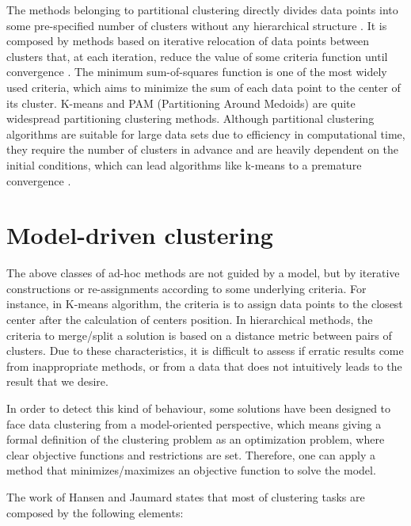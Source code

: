 The methods belonging to partitional clustering directly divides data points into some pre-specified number of clusters without any hierarchical structure \cite{Xu2005}. It is composed by methods based on iterative relocation of data points between clusters that, at each iteration, reduce the value of some criteria function until convergence \cite{Karkkainen2006}. The minimum sum-of-squares function is one of the most widely used criteria, which aims to minimize the sum of each data point to the center of its cluster. K-means and PAM (Partitioning Around Medoids) are quite widespread partitioning clustering methods. Although partitional clustering algorithms are suitable for large data sets due to efficiency in computational time, they require the number of clusters in advance and are heavily dependent on the initial conditions, which can lead algorithms like k-means to a premature convergence \cite{Das2009}.

\section{Model-driven clustering}
The above classes of ad-hoc methods are not guided by a model, but by iterative constructions or re-assignments according to some underlying criteria. For instance, in K-means algorithm, the criteria is to assign data points to the closest center after the calculation of centers position. In hierarchical methods, the criteria to merge/split a solution is based on a distance metric between pairs of clusters. Due to these characteristics, it is difficult to assess if erratic results come from inappropriate methods, or from a data that does not intuitively leads to the result that we desire.

In order to detect this kind of behaviour, some solutions have been designed to face data clustering from a model-oriented perspective, which means giving a formal definition of the clustering problem as an optimization problem, where clear objective functions and restrictions are set. Therefore, one can apply a method that minimizes/maximizes an objective function to solve the model.

The work of Hansen and Jaumard \cite{Hansen1997} states that most of clustering tasks are composed by the following elements:

